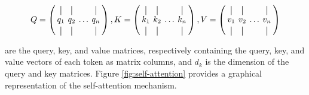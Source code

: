 \[
    Q = 
    \left(
      \begin{array}{@{\hskip 2pt}c@{\hskip 4pt}c@{\hskip 4pt}c@{\hskip 4pt}c@{\hskip 2pt}}
        \vertbar & \vertbar &        & \vertbar \\
        q_{1}    & q_{2}    & \ldots & q_{n}    \\
        \vertbar & \vertbar &        & \vertbar 
      \end{array}
    \right), 
    K = 
    \left(
    \begin{array}{@{\hskip 2pt}c@{\hskip 4pt}c@{\hskip 4pt}c@{\hskip 4pt}c@{\hskip 2pt}}
        \vertbar & \vertbar &        & \vertbar \\
        k_{1}    & k_{2}    & \ldots & k_{n}    \\
        \vertbar & \vertbar &        & \vertbar 
    \end{array}
    \right),
    V = 
    \left(
    \begin{array}{@{\hskip 2pt}c@{\hskip 4pt}c@{\hskip 4pt}c@{\hskip 4pt}c@{\hskip 2pt}}
        \vertbar & \vertbar &        & \vertbar \\
        v_{1}    & v_{2}    & \ldots & v_{n}    \\
        \vertbar & \vertbar &        & \vertbar 
    \end{array}
    \right)
\]

are the query, key, and value matrices, respectively containing the query, key, and value vectors of each token as matrix columns, and $d_k$ is the dimension of the query and key matrices. Figure \ref{fig:self-attention} provides a graphical representation of the self-attention mechanism.


